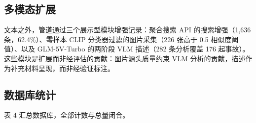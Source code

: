 \documentclass[11pt]{article}
\begin{document}
\subsection{{\cjkfont 多\allowbreak 模\allowbreak 态\allowbreak 扩\allowbreak 展}}
{\cjkfont 文\allowbreak 本\allowbreak 之\allowbreak 外\allowbreak ，\allowbreak 管\allowbreak 道\allowbreak 通\allowbreak 过\allowbreak 三\allowbreak 个\allowbreak 展\allowbreak 示\allowbreak 型\allowbreak 模\allowbreak 块\allowbreak 增\allowbreak 强\allowbreak 记\allowbreak 录\allowbreak ：\allowbreak 聚\allowbreak 合\allowbreak 搜\allowbreak 索} API {\cjkfont 的\allowbreak 搜\allowbreak 索\allowbreak 增\allowbreak 强\allowbreak （}1,636 {\cjkfont 条\allowbreak ，}62.4\%{\cjkfont ）\allowbreak 、\allowbreak 零\allowbreak 样\allowbreak 本} CLIP {\cjkfont 分\allowbreak 类\allowbreak 器\allowbreak 过\allowbreak 滤\allowbreak 的\allowbreak 图\allowbreak 片\allowbreak 采\allowbreak 集\allowbreak （}226 {\cjkfont 张\allowbreak 高\allowbreak 于} 0.5 {\cjkfont 相\allowbreak 似\allowbreak 度\allowbreak 阈\allowbreak 值\allowbreak ）\allowbreak 、\allowbreak 以\allowbreak 及} GLM-5V-Turbo {\cjkfont 的\allowbreak 两\allowbreak 阶\allowbreak 段} VLM {\cjkfont 描\allowbreak 述\allowbreak （}282 {\cjkfont 条\allowbreak 分\allowbreak 析\allowbreak 覆\allowbreak 盖} 176 {\cjkfont 起\allowbreak 事\allowbreak 故\allowbreak ）\allowbreak 。\allowbreak 这\allowbreak 些\allowbreak 模\allowbreak 块\allowbreak 是\allowbreak 扩\allowbreak 展\allowbreak 而\allowbreak 非\allowbreak 经\allowbreak 评\allowbreak 估\allowbreak 的\allowbreak 贡\allowbreak 献\allowbreak ：\allowbreak 图\allowbreak 片\allowbreak 源\allowbreak 头\allowbreak 质\allowbreak 量\allowbreak 约\allowbreak 束} VLM {\cjkfont 分\allowbreak 析\allowbreak 的\allowbreak 贡\allowbreak 献\allowbreak ，\allowbreak 描\allowbreak 述\allowbreak 作\allowbreak 为\allowbreak 补\allowbreak 充\allowbreak 材\allowbreak 料\allowbreak 呈\allowbreak 现\allowbreak ，\allowbreak 而\allowbreak 非\allowbreak 经\allowbreak 验\allowbreak 证\allowbreak 标\allowbreak 注\allowbreak 。}

\subsection{{\cjkfont 数\allowbreak 据\allowbreak 库\allowbreak 统\allowbreak 计}}
{\cjkfont 表} 4 {\cjkfont 汇\allowbreak 总\allowbreak 数\allowbreak 据\allowbreak 库\allowbreak ，\allowbreak 全\allowbreak 部\allowbreak 计\allowbreak 数\allowbreak 与\allowbreak 总\allowbreak 量\allowbreak 闭\allowbreak 合\allowbreak 。}
\end{document}
